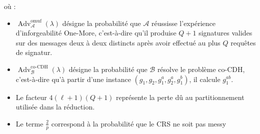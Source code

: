 \documentclass[10pt,a4paper]{article}
\theoremstyle{definition}
\theoremstyle{plain}
\theoremstyle{remark}
\begin{document}
où :
\begin{itemize}
    \item $\operatorname{Adv}_{\mathcal{A}}^{\mathrm{omuf}}(\lambda)$
    désigne la probabilité que $\mathcal{A}$ réussisse l'expérience
    d'inforgeabilité One-More, c'est-à-dire qu'il produise $Q+1$
    signatures valides sur des messages deux à deux distincts après
    avoir effectué au plus $Q$ requêtes de signatur.

    \item $\operatorname{Adv}_{\mathcal{B}}^{\mathrm{co\text{-}CDH}}(\lambda)$
    désigne la probabilité que $\mathcal{B}$ résolve le problème
    co-CDH, c'est-à-dire qu'à partir d'une instance
    $(g_1,g_2,g_1^a,g_2^a,g_1^b)$, il calcule $g_1^{ab}$.

    \item Le facteur $4(\ell+1)(Q+1)$ représente la perte dû
    au partitionnement utilisée dans la réduction.

    \item Le terme $\frac{2}{p}$ correspond à la probabilité que le
    CRS ne soit pas messy
\end{itemize}
\end{document}
